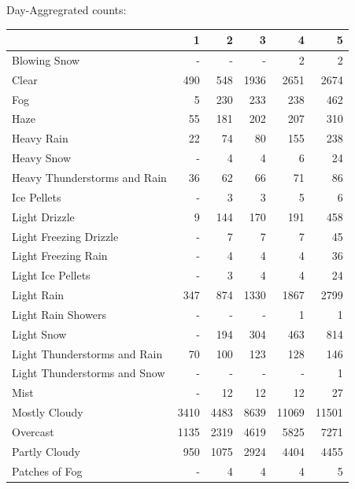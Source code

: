 \documentclass[11pt]{scrartcl}
\begin{document}
Day-Aggregrated counts:
\begin{tabular}{lrrrrr}
\toprule
{} &     1 &     2 &     3 &      4 &      5 \\
\midrule
Blowing Snow                  &   - &   - &   - &      2 &      2 \\
Clear                         &   490 &   548 &  1936 &   2651 &   2674 \\
Fog                           &     5 &   230 &   233 &    238 &    462 \\
Haze                          &    55 &   181 &   202 &    207 &    310 \\
Heavy Rain                    &    22 &    74 &    80 &    155 &    238 \\
Heavy Snow                    &   - &     4 &     4 &      6 &     24 \\
Heavy Thunderstorms and Rain  &    36 &    62 &    66 &     71 &     86 \\
Ice Pellets                   &   - &     3 &     3 &      5 &      6 \\
Light Drizzle                 &     9 &   144 &   170 &    191 &    458 \\
Light Freezing Drizzle        &   - &     7 &     7 &      7 &     45 \\
Light Freezing Rain           &   - &     4 &     4 &      4 &     36 \\
Light Ice Pellets             &   - &     3 &     4 &      4 &     24 \\
Light Rain                    &   347 &   874 &  1330 &   1867 &   2799 \\
Light Rain Showers            &   - &   - &   - &      1 &      1 \\
Light Snow                    &   - &   194 &   304 &    463 &    814 \\
Light Thunderstorms and Rain  &    70 &   100 &   123 &    128 &    146 \\
Light Thunderstorms and Snow  &   - &   - &   - &    - &      1 \\
Mist                          &   - &    12 &    12 &     12 &     27 \\
Mostly Cloudy                 &  3410 &  4483 &  8639 &  11069 &  11501 \\
Overcast                      &  1135 &  2319 &  4619 &   5825 &   7271 \\
Partly Cloudy                 &   950 &  1075 &  2924 &   4404 &   4455 \\
Patches of Fog                &   - &     4 &     4 &      4 &      5 \\

\end{tabular}
\end{document}
